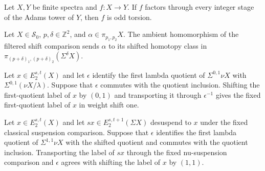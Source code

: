 \begin{theorem}
\label{frontier:AdamsSynthetic:1ae83419acab}
Let $X,Y$ be finite spectra and $f\colon X\to Y$. If $f$ factors through every integer stage of the Adams tower of $Y$, then $f$ is odd torsion.
\end{theorem}











\begin{theorem}
\label{frontier:AdamsSynthetic:b321b7897dca}
Let $X\in\mathcal S_0$, $p,\delta\in\mathbb Z^2$, and $\alpha\in\pi_{p_1,p_2}X$. The ambient homomorphism of the filtered shift comparison sends $\alpha$ to its shifted homotopy class in $\pi_{(p+\delta)_1,(p+\delta)_2}(\Sigma^\delta X)$.
\end{theorem}











\begin{theorem}
\label{frontier:AdamsSynthetic:894dd8ba400f}
Let $x\in E_2^{s,t}(X)$ and let $\epsilon$ identify the first lambda quotient of $\Sigma^{0,1}\nu X$ with $\Sigma^{0,1}(\nu X/\lambda)$. Suppose that $\epsilon$ commutes with the quotient inclusion. Shifting the first-quotient label of $x$ by $(0,1)$ and transporting it through $\epsilon^{-1}$ gives the fixed first-quotient label of $x$ in weight shift one.
\end{theorem}

\begin{theorem}
\label{frontier:AdamsSynthetic:837d666cb875}
Let $x\in E_2^{s,t}(X)$ and let $sx\in E_2^{s,t+1}(\Sigma X)$ desuspend to $x$ under the fixed classical suspension comparison. Suppose that $\epsilon$ identifies the first lambda quotient of $\Sigma^{1,1}\nu X$ with the shifted quotient and commutes with the quotient inclusion. Transporting the label of $sx$ through the fixed nu-suspension comparison and $\epsilon$ agrees with shifting the label of $x$ by $(1,1)$.
\end{theorem}
